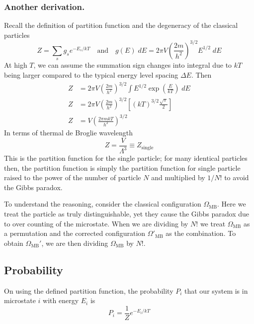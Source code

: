 \documentclass[../../../Main.tex]{subfiles}
\begin{document}
\subsubsection*{Another derivation.} Recall the definition of partition function and the degeneracy of the classical particles
\begin{equation*}
    Z=\sum_{s} g_se^{-E_s/kT}\quad\text{and}\quad g(E)\;dE=2\pi V\left(\frac{2m}{h^2}\right)^{3/2}E^{1/2}\;dE
\end{equation*}
At high $T$, we can assume the summation sign changes into integral due to $kT$ being larger compared to the typical energy level spacing $\Delta E$. Then 
\begin{align*}
    Z&=2\pi V\left(\frac{2m}{h^2}\right)^{3/2}\int E^{1/2}\exp \left(\frac{E}{kT}\right)\;dE\\
    Z&=2\pi V\left(\frac{2m}{h^2}\right)^{3/2}\left[(kT)^{3/2}\frac{\sqrt{\pi}}{2}\right]\\
    Z&=V\left(\frac{2\pi mkT}{h^2}\right)^{3/2}
\end{align*}
In terms of thermal de Broglie wavelength
\begin{equation*}
    Z=\frac{V}{\Lambda^3}\equiv Z_\text{single}
\end{equation*}
This is the partition function for the single particle; for many identical particles then, the partition function is simply the partition function for single particle raised to the power of the number of particle $N$ and multiplied by $1/N!$ to avoid the Gibbs paradox.

To understand the reasoning, consider the classical configuration $\Omega_\text{MB}$. Here we treat the particle as truly distinguishable, yet they cause the Gibbs paradox due to over counting of the microstate. When we are dividing by $N!$ we treat $\Omega_\text{MB}$ as a permutation and the corrected configuration $\Omega'_\text{MB}$ as the combination. To obtain $\Omega_\text{MB}'$, we are then dividing $\Omega_\text{MB}$ by $N!$.

\subsection*{Probability}
On using the defined partition function, the probability $P_i$ that our system is in microstate $i$ with energy $E_i$ is
\begin{equation*}
    P_i=\frac{1}{Z}e^{-E_i/kT}
\end{equation*}
\end{document}
